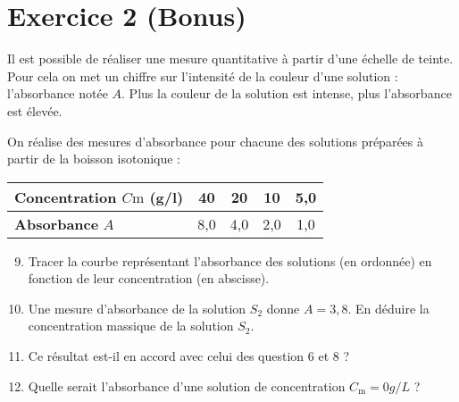 \documentclass[12pt,a4paper]{article}
\begin{document}
\section*{Exercice 2 (Bonus)}

Il est possible de réaliser une mesure quantitative à partir d'une échelle de teinte.
Pour cela on met un chiffre sur l'intensité de la couleur d'une solution : l'absorbance notée $A$.
Plus la couleur de la solution est intense, plus l'absorbance est élevée.

On réalise des mesures d'absorbance pour chacune des solutions préparées à partir de la boisson isotonique :
\begin{center}
\begin{tabular}{l|c|c|c|c}
\textbf{Concentration} $C\mathrm{m}$ (g/l) & 40 & 20 & 10 & 5{,}0 \\
\hline
\textbf{Absorbance} $A$ & 8{,}0 & 4{,}0 & 2{,}0 & 1{,}0
\end{tabular}
\end{center}

\begin{enumerate}
\setcounter{enumi}{8}
\item \rea{}

Tracer la courbe représentant l'absorbance des solutions (en ordonnée) en fonction de leur concentration (en abscisse).

\item \anarai{}

Une mesure d'absorbance de la solution $S_2$ donne $A = 3{,}8$.
En déduire la concentration massique de la solution $S_2$.

\item \val{}

Ce résultat est-il en accord avec celui des question \textcolor{red_f}{6} et \textcolor{red_f}{8} ?

\item \anarai{}

Quelle serait l'absorbance d'une solution de concentration $C_\mathrm{m}=\unit{0}{g/L}$ ?

\end{enumerate}
\end{document}
